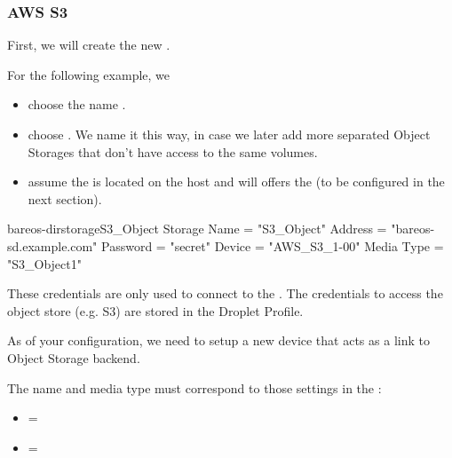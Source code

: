 \subsubsection{AWS S3}
\label{sec:DropletAwsS3}


First, we will create the new \bareosDir {}.

For the following example, we
\begin{itemize}
  \item choose the name .
  \item choose . We name it this way, in case we later add more separated Object Storages that don't have access to the same volumes.
  \item assume the \bareosSd is located on the host  and will offers the   (to be configured in the next section).
\end{itemize}

\begin{bareosConfigResource}{bareos-dir}{storage}{S3\_Object}
Storage {
    Name = "S3_Object"
    Address  = "bareos-sd.example.com"
    Password = "secret"
    Device = "AWS_S3_1-00"
    Media Type = "S3_Object1"
}
\end{bareosConfigResource}

These credentials are only used to connect to the \bareosSd. The credentials to access the object store (e.g. S3) are stored in the \bareosSd Droplet Profile.





As of your \bareosSd configuration, we need to setup a new device that acts as a link to Object Storage backend.

The name and media type must correspond to those settings in the \bareosDir {}:

\begin{itemize}
        \item {} = 
        \item {} = 
\end{itemize}


